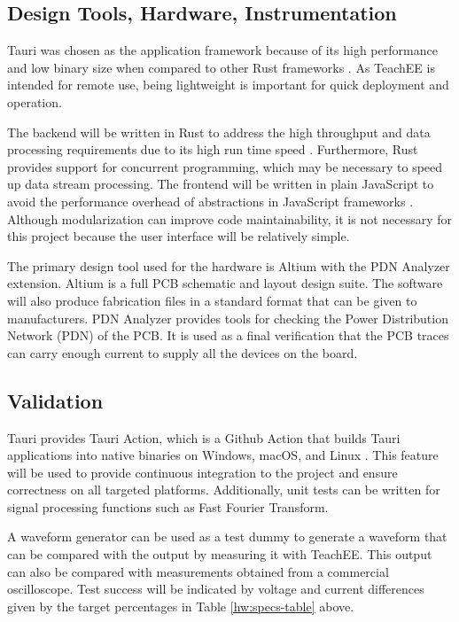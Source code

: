 \documentclass[letterpaper,12pt]{article}
\begin{document}
\subsection{Design Tools, Hardware, Instrumentation}
Tauri was chosen as the application framework because of its high performance
and low binary size when compared to other Rust frameworks 
\cite{tauri_benchmarks}. As TeachEE is intended for remote use, being
lightweight is important for quick deployment and operation.

The backend will be written in Rust to address the high throughput and
data processing requirements due to its high run time speed \cite{rust_speed}.
Furthermore, Rust provides support for concurrent programming, which may be
necessary to speed up data stream processing. The frontend will be written in
plain JavaScript to avoid the performance overhead of abstractions in
JavaScript frameworks \cite{javascript_speed}. Although modularization can
improve code maintainability, it is not necessary for this project because the
user interface will be relatively simple.

The primary design tool used for the hardware is Altium with the PDN Analyzer
extension. Altium is a full PCB schematic and layout design suite. The software
will also produce fabrication files in a standard format that can be given to
manufacturers. PDN Analyzer provides tools for checking the Power Distribution
Network (PDN) of the PCB. It is used as a final verification that the PCB
traces can carry enough current to supply all the devices on the board.

\subsection{Validation}
Tauri provides Tauri Action, which is a Github Action that builds Tauri
applications into native binaries on Windows, macOS, and Linux
\cite{tauri_actions}. This feature will be used to provide continuous integration
to the project and ensure correctness on all targeted platforms. Additionally, unit
tests can be written for signal processing functions such as Fast Fourier Transform.

A waveform generator can be used as a test dummy to generate a waveform that
can be compared with the output by measuring it with TeachEE.
This output can also be compared with measurements obtained from a commercial
oscilloscope. Test success will be indicated by voltage and current differences
given by the target percentages in Table \ref{hw:specs-table} above.
\end{document}
